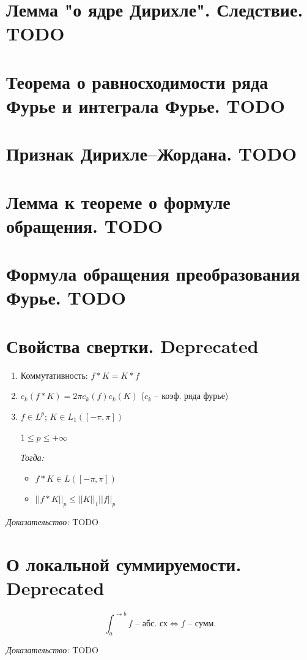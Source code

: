 \documentclass[paper=a4, fontsize=17pt]{article}
\begin{document}
\section{Лемма "о ядре Дирихле". Следствие. TODO}
\section{Теорема о равносходимости ряда Фурье и интеграла Фурье. TODO}
\section{Признак Дирихле--Жордана. TODO}
\section{Лемма к теореме о формуле обращения. TODO}
\section{Формула обращения преобразования Фурье. TODO}


\section{Свойства свертки.  \Large Deprecated}

\begin{enumerate}
	\item Коммутативность: $ f \ast K = K \ast f$
	\item $ c_k(f \ast K) = 2\pi c_k(f) c_k(K) $ ($ c_k $ -- коэф. ряда фурье)
	\item
		$ f \in L^p $; $ K \in L_1( [-\pi, \pi]) $

		$ 1 \leqslant p \leqslant +\infty $

		\emph{Тогда:}
		\begin{itemize}
			\item $ f \ast K \in L([-\pi, \pi]) $
			\item $ ||f \ast K||_{p} \leqslant ||K||_1 ||f||_p $
		\end{itemize}
\end{enumerate}

\emph{Доказательство:} TODO

\section{О локальной суммируемости. \Large Deprecated}
$$ \int_{a}^{\rightarrow b} f \text{ -- абс. сх} \Longleftrightarrow f \text{ -- сумм.}$$

\emph{Доказательство:} TODO
\end{document}
